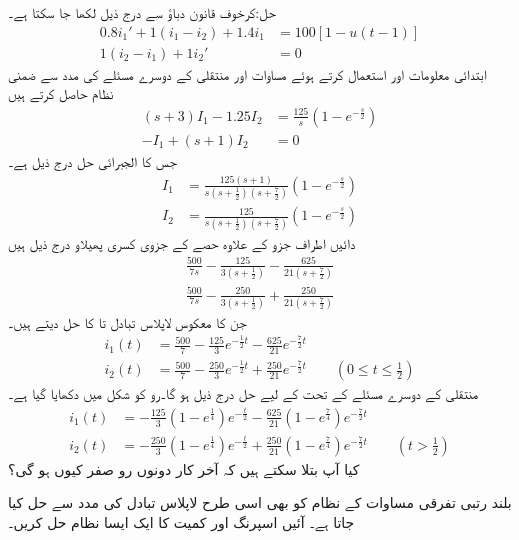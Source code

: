 حل:کرخوف قانون دباؤ سے درج ذیل لکھا جا سکتا ہے۔
\begin{align*}
0.8i_1'+1(i_1-i_2)+1.4i_1&=100[1-u(t-1)]\\
1(i_2-i_1)+1i_2'&=0
\end{align*}
ابتدائی معلومات  اور  استعمال کرتے ہوئے مساوات  اور منتقلی کے دوسرے مسئلے کی مدد سے ضمنی نظام حاصل کرتے ہیں
\begin{align*}
(s+3)I_1-1.25I_2&=\frac{125}{s}(1-e^{-\frac{s}{2}})\\
-I_1+(s+1)I_2&=0
\end{align*}
جس کا الجبرائی حل درج ذیل ہے۔
\begin{align*}
I_1&=\frac{125(s+1)}{s(s+\frac{1}{2})(s+\frac{7}{2})}(1-e^{-\frac{s}{2}})\\
I_2&=\frac{125}{s(s+\frac{1}{2})(s+\frac{7}{2})}(1-e^{-\frac{s}{2}})
\end{align*}
دائیں اطراف جزو  کے علاوہ حصے کے جزوی کسری پھیلاو درج ذیل ہیں
\begin{align*}
\frac{500}{7s}-\frac{125}{3(s+\frac{1}{2})}-\frac{625}{21(s+\frac{7}{2})}\\
\frac{500}{7s}-\frac{250}{3(s+\frac{1}{2})}+\frac{250}{21(s+\frac{7}{2})}
\end{align*}
جن کا معکوس لاپلاس تبادل  تا  کا حل دیتے ہیں۔ 
\begin{align*}
i_1(t)&=\frac{500}{7}-\frac{125}{3}e^{-\frac{1}{2}t}-\frac{625}{21}e^{-\frac{7}{2}t}\\
i_2(t)&=\frac{500}{7}-\frac{250}{3}e^{-\frac{1}{2}t}+\frac{250}{21}e^{-\frac{7}{2}t}\quad \quad (0\le t \le \frac{1}{2})
\end{align*}
منتقلی کے دوسرے مسئلے کے تحت  کے لیے حل  درج ذیل ہو گا۔رو کو شکل  میں دکھایا گیا ہے۔
\begin{align*}
i_1(t)&=-\frac{125}{3}(1-e^{\frac{1}{4}})e^{-\frac{t}{2}}-\frac{625}{21}(1-e^{\frac{7}{4}})e^{-\frac{7}{2}t}\\
i_2(t)&=-\frac{250}{3}(1-e^{\frac{1}{4}})e^{-\frac{t}{2}}+\frac{250}{21}(1-e^{\frac{7}{4}})e^{-\frac{7}{2}t}\quad \quad (t>\frac{1}{2}) 
\end{align*}
کیا آپ بتلا سکتے ہیں کہ آخر کار دونوں رو صفر کیوں ہو گی؟ 

بلند رتبی تفرقی مساوات کے نظام کو بھی اسی طرح لاپلاس تبادل کی مدد سے حل کیا جاتا ہے۔ آئیں اسپرنگ اور کمیت کا ایک ایسا نظام حل کریں۔

